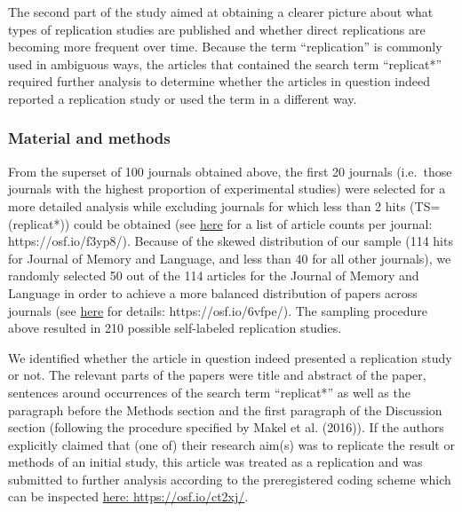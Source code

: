 \documentclass[]{elsarticle} %
\begin{document}
The second part of the study aimed at obtaining a clearer picture about
what types of replication studies are published and whether direct
replications are becoming more frequent over time. Because the term
``replication'' is commonly used in ambiguous ways, the articles that
contained the search term ``replicat*'' required further analysis to
determine whether the articles in question indeed reported a replication
study or used the term in a different way.

\hypertarget{material-and-methods-1}{%
\subsubsection{Material and methods}\label{material-and-methods-1}}

From the superset of 100 journals obtained above, the first 20 journals
(i.e.~those journals with the highest proportion of experimental
studies) were selected for a more detailed analysis while excluding
journals for which less than 2 hits (TS=(replicat*)) could be obtained
(see \href{https://osf.io/f3yp8/}{here} for a list of article counts per
journal: https://osf.io/f3yp8/). Because of the skewed distribution of
our sample (114 hits for Journal of Memory and Language, and less than
40 for all other journals), we randomly selected 50 out of the 114
articles for the Journal of Memory and Language in order to achieve a
more balanced distribution of papers across journals (see
\href{https://osf.io/6vfpe/}{here} for details: https://osf.io/6vfpe/).
The sampling procedure above resulted in 210 possible self-labeled
replication studies.

We identified whether the article in question indeed presented a
replication study or not. The relevant parts of the papers were title
and abstract of the paper, sentences around occurrences of the search
term ``replicat*'' as well as the paragraph before the Methods section
and the first paragraph of the Discussion section (following the
procedure specified by Makel et al. (2016)). If the authors explicitly
claimed that (one of) their research aim(s) was to replicate the result
or methods of an initial study, this article was treated as a
replication and was submitted to further analysis according to the
preregistered coding scheme which can be inspected
\href{https://osf.io/ct2xj/}{here: https://osf.io/ct2xj/}.
\end{document}
